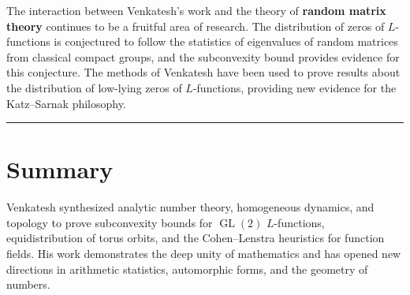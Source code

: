 The interaction between Venkatesh's work \cite{venkatesh2018} and the theory of \textbf{random matrix theory} continues to be a fruitful area of research. The distribution of zeros of $L$-functions is conjectured to follow the statistics of eigenvalues of random matrices from classical compact groups, and the subconvexity bound provides evidence for this conjecture. The methods of Venkatesh have been used to prove results about the distribution of low-lying zeros of $L$-functions, providing new evidence for the Katz--Sarnak philosophy.

\begin{center}\rule{0.5\linewidth}{0.5pt}\end{center}

\section*{Summary}

Venkatesh synthesized analytic number theory, homogeneous dynamics, and topology to prove subconvexity bounds for $\operatorname{GL}(2)$ $L$-functions, equidistribution of torus orbits, and the Cohen--Lenstra heuristics for function fields. His work demonstrates the deep unity of mathematics and has opened new directions in arithmetic statistics, automorphic forms, and the geometry of numbers.
